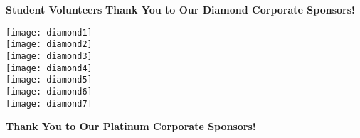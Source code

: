 \documentclass[twoside]{article}
\begin{document}
    { \fontsize{14}{17}\selectfont \bf Student Volunteers}\newpage
    { \fontsize{16}{19}\selectfont \bf Thank You to Our Diamond Corporate Sponsors!}\\
    \begin{center}\vspace{-1.3em}
    \begin{adjustbox}{max size={0.65\textwidth}{!}}\texttt{[image: diamond1]}\end{adjustbox}\vspace{1em}\\
        \begin{adjustbox}{max size={0.65\textwidth}{!}}\texttt{[image: diamond2]}\end{adjustbox}\vspace{1em}\\
        \begin{adjustbox}{max size={0.65\textwidth}{!}}\texttt{[image: diamond3]}\end{adjustbox}\vspace{1em}\\
        \begin{adjustbox}{max size={0.65\textwidth}{!}}\texttt{[image: diamond4]}\end{adjustbox}\vspace{1em}\\
        \begin{adjustbox}{max size={0.65\textwidth}{!}}\texttt{[image: diamond5]}\end{adjustbox}\vspace{1em}\\
        \begin{adjustbox}{max size={0.65\textwidth}{!}}\texttt{[image: diamond6]}\end{adjustbox}\vspace{1em}\\
        \begin{adjustbox}{max size={0.65\textwidth}{!}}\texttt{[image: diamond7]}\end{adjustbox}\vspace{1em}\\
        \end{center}
    \newpage
    { \fontsize{16}{19}\selectfont \bf Thank You to Our Platinum Corporate Sponsors!}
\end{document}
